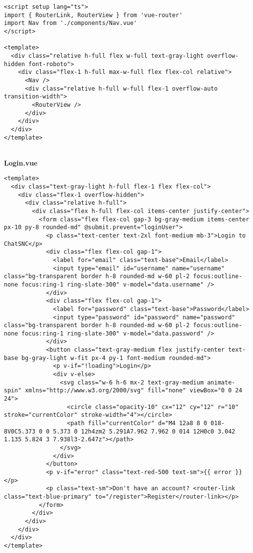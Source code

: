 \begin{Verbatim}[breaklines=true, breakanywhere=true]
<script setup lang="ts">
import { RouterLink, RouterView } from 'vue-router'
import Nav from './components/Nav.vue'
</script>

<template>
  <div class="relative h-full flex w-full text-gray-light overflow-hidden font-roboto">
    <div class="flex-1 h-full max-w-full flex flex-col relative">
      <Nav />
      <div class="relative h-full w-full flex-1 overflow-auto transition-width">
        <RouterView />
      </div>
    </div>
  </div>
</template>

\end{Verbatim}
\
\\
\textbf{Login.vue}

\begin{Verbatim}[breaklines=true, breakanywhere=true]
<template>
  <div class="text-gray-light h-full flex-1 flex flex-col">
    <div class="flex-1 overflow-hidden">
      <div class="relative h-full">
        <div class="flex h-full flex-col items-center justify-center">
          <form class="flex flex-col gap-3 bg-gray-medium items-center px-10 py-8 rounded-md" @submit.prevent="loginUser">
            <p class="text-center text-2xl font-medium mb-3">Login to ChatSNC</p>
            <div class="flex flex-col gap-1">
              <label for="email" class="text-base">Email</label>
              <input type="email" id="username" name="username" class="bg-transparent border h-8 rounded-md w-60 pl-2 focus:outline-none focus:ring-1 ring-slate-300" v-model="data.username" />
            </div>
            <div class="flex flex-col gap-1">
              <label for="password" class="text-base">Password</label>
              <input type="password" id="password" name="password" class="bg-transparent border h-8 rounded-md w-60 pl-2 focus:outline-none focus:ring-1 ring-slate-300" v-model="data.password" />
            </div>
            <button class="text-gray-medium flex justify-center text-base bg-gray-light w-fit px-4 py-1 font-medium rounded-md">
              <p v-if="!loading">Login</p>
              <div v-else>
                <svg class="w-6 h-6 mx-2 text-gray-medium animate-spin" xmlns="http://www.w3.org/2000/svg" fill="none" viewBox="0 0 24 24">
                  <circle class="opacity-10" cx="12" cy="12" r="10" stroke="currentColor" stroke-width="4"></circle>
                  <path fill="currentColor" d="M4 12a8 8 0 018-8V0C5.373 0 0 5.373 0 12h4zm2 5.291A7.962 7.962 0 014 12H0c0 3.042 1.135 5.824 3 7.938l3-2.647z"></path>
                </svg>
              </div>
            </button>
            <p v-if="error" class="text-red-500 text-sm">{{ error }}</p>
            <p class="text-sm">Don't have an account? <router-link class="text-blue-primary" to="/register">Register</router-link></p>
          </form>
        </div>
      </div>
    </div>
  </div>
</template>


\end{Verbatim}
